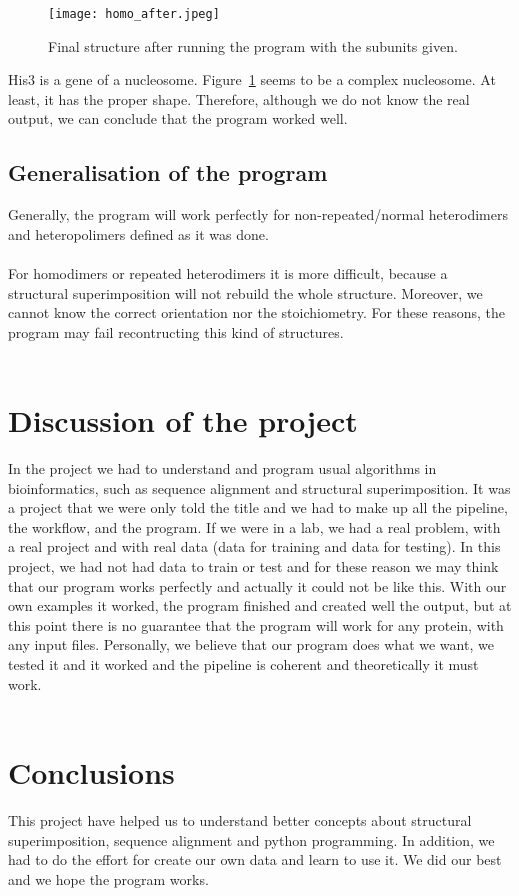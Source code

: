 \documentclass[a4paper,10pt]{report}
\begin{document}
\begin{figure}[h]
\centering
\texttt{[image: homo\_after.jpeg]}
\caption{Final structure after running the program with the subunits given.}
\label{fig:4}
\end{figure}

\noindent
His3 is a gene of a nucleosome. Figure~\ref{fig:4} seems to be a complex nucleosome. At least, it has the proper shape. Therefore, although we do not know the real output, we can conclude that the program worked well.\\



\section{Generalisation of the program}

Generally, the program will work perfectly for non-repeated/normal heterodimers and heteropolimers defined as it was done.\\\\
For homodimers or repeated heterodimers it is more difficult, because a structural superimposition will not rebuild the whole structure. Moreover, we cannot know the correct orientation nor the stoichiometry. For these reasons, the program may fail recontructing this kind of structures.\\\\



\chapter{Discussion of the project}

In the project we had to understand and program usual algorithms in bioinformatics, such as sequence alignment and structural superimposition. It was a project that we were only told the title and we had to make up all the pipeline, the workflow, and the program.
If we were in a lab, we had a real problem, with a real project and with real data (data for training and data for testing). In this project, we had not had data to train or test and for these reason we may think that our program works perfectly and actually it could not be like this. With our own examples it worked, the program finished and created well the output, but at this point there is no guarantee that the program will work for any protein, with any input files. Personally, we believe that our program does what we want, we tested it and it worked and the pipeline is coherent and theoretically it must work.\\\\

\chapter{Conclusions}

This project have helped us to understand better concepts about structural superimposition, sequence alignment and python programming. In addition, we had to do the effort for create our own data and learn to use it. We did our best and we hope the program works.
\end{document}
